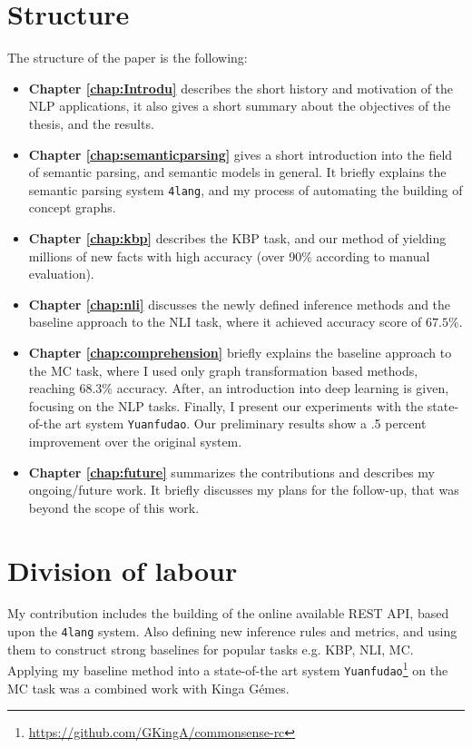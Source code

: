 \section{Structure}
The structure of the paper is the following:
\begin{itemize}
	\item \textbf{Chapter \ref{chap:Introdu}} describes the short history and motivation of the NLP applications, it also gives a short summary about the objectives of the thesis, and the results.
	\item \textbf{Chapter \ref{chap:semanticparsing}} gives a short introduction into the field of semantic parsing, and semantic models in general. It briefly explains the semantic parsing system \texttt{4lang}, and my process of automating the building of concept graphs.
	\item \textbf{Chapter \ref{chap:kbp}} describes the KBP task, and our method of yielding millions of new facts with high accuracy (over 90\% according to manual evaluation).
	\item \textbf{Chapter \ref{chap:nli}} discusses the newly defined inference methods and the baseline approach to the NLI task, where it achieved accuracy score of $67.5\%$.
	\item \textbf{Chapter \ref{chap:comprehension}} briefly explains the baseline approach to the MC task, where I used only graph transformation based methods, reaching $68.3\%$ accuracy. After, an introduction into deep learning is given, focusing on the NLP tasks. Finally, I present our experiments with the state-of-the art system \texttt{Yuanfudao}. Our preliminary results show a .5 percent improvement over the original system.
	\item \textbf{Chapter \ref{chap:future}} summarizes the contributions and describes my ongoing/future work. It briefly discusses my plans for the follow-up, that was beyond the scope of this work.
\end{itemize}

\section{Division of labour}
My contribution includes the building of the online available REST API, based upon the \texttt{4lang} system. Also defining new inference rules and metrics, and using them to construct strong baselines for popular tasks e.g. KBP, NLI, MC. Applying my baseline method into a state-of-the art system \texttt{Yuanfudao}\cite{Wang:2018}\footnote{\url{https://github.com/GKingA/commonsense-rc}} on the MC task was a combined work with Kinga G\'emes.